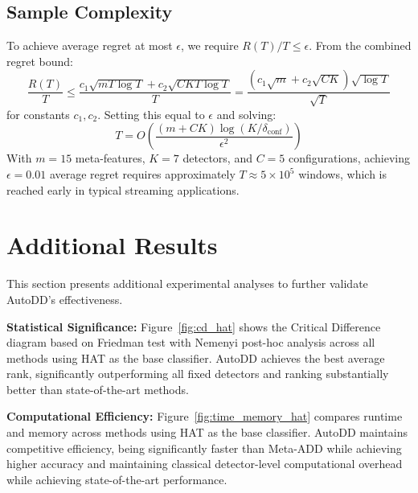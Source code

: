 \documentclass[11pt]{article}
\begin{document}
\subsection{Sample Complexity}

To achieve average regret at most $\epsilon$, we require $R(T)/T \leq \epsilon$. From the combined regret bound:
\begin{equation}
\frac{R(T)}{T} \leq \frac{c_1\sqrt{mT\log T} + c_2\sqrt{CKT\log T}}{T} = \frac{(c_1\sqrt{m} + c_2\sqrt{CK})\sqrt{\log T}}{\sqrt{T}}
\end{equation}
for constants $c_1, c_2$. Setting this equal to $\epsilon$ and solving:
\begin{equation}
T = O\left(\frac{(m + CK)\log(K/\delta_{\text{conf}})}{\epsilon^2}\right)
\end{equation}
With $m = 15$ meta-features, $K = 7$ detectors, and $C = 5$ configurations, achieving $\epsilon = 0.01$ average regret requires approximately $T \approx 5 \times 10^5$ windows, which is reached early in typical streaming applications.


\section{Additional Results}\label{appendix:additional_results}

This section presents additional experimental analyses to further validate AutoDD's effectiveness. %

\textbf{Statistical Significance:} Figure~\ref{fig:cd_hat} shows the Critical Difference diagram based on Friedman test with Nemenyi post-hoc analysis across all methods using HAT as the base classifier. AutoDD achieves the best average rank, significantly outperforming all fixed detectors and ranking substantially better than state-of-the-art methods.

\textbf{Computational Efficiency:} Figure~\ref{fig:time_memory_hat} compares runtime and memory across methods using HAT as the base classifier. AutoDD maintains competitive efficiency, being significantly faster than Meta-ADD while achieving higher accuracy and maintaining classical detector-level computational overhead while achieving state-of-the-art performance.
\end{document}
